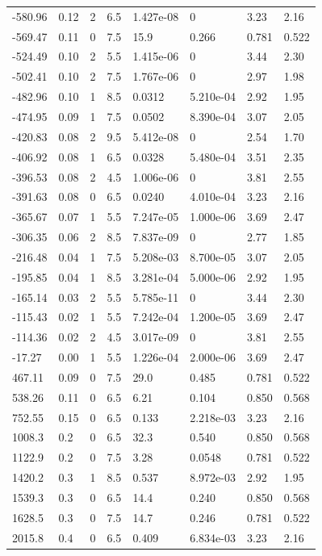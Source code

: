 \documentclass[preview]{standalone}
\begin{document}
{{\begin{tabular}{L{1.2cm}C{1.2cm} C{0.3cm}C{0.5cm} C{1.4cm}C{1.4cm} C{1.4cm}C{1.4cm}}
  -580.96  &  0.12  & 2     & 6.5 &  1.427e-08  & 0  & 3.23 &  2.16   \\ 
  -569.47  &  0.11  & 0     & 7.5 &  15.9  & 0.266  & 0.781 &  0.522   \\ 
  -524.49  &  0.10  & 2     & 5.5 &  1.415e-06  & 0  & 3.44 &  2.30   \\ 
  -502.41  &  0.10  & 2     & 7.5 &  1.767e-06  & 0  & 2.97 &  1.98   \\ 
  -482.96  &  0.10  & 1     & 8.5 &  0.0312  & 5.210e-04  & 2.92 &  1.95   \\ 
  -474.95  &  0.09  & 1     & 7.5 &  0.0502  & 8.390e-04  & 3.07 &  2.05   \\ 
  -420.83  &  0.08  & 2     & 9.5 &  5.412e-08  & 0  & 2.54 &  1.70   \\ 
  -406.92  &  0.08  & 1     & 6.5 &  0.0328  & 5.480e-04  & 3.51 &  2.35   \\ 
  -396.53  &  0.08  & 2     & 4.5 &  1.006e-06  & 0  & 3.81 &  2.55   \\ 
  -391.63  &  0.08  & 0     & 6.5 &  0.0240  & 4.010e-04  & 3.23 &  2.16   \\ 
  -365.67  &  0.07  & 1     & 5.5 &  7.247e-05  & 1.000e-06  & 3.69 &  2.47   \\ 
  -306.35  &  0.06  & 2     & 8.5 &  7.837e-09  & 0  & 2.77 &  1.85   \\ 
  -216.48  &  0.04  & 1     & 7.5 &  5.208e-03  & 8.700e-05  & 3.07 &  2.05   \\ 
  -195.85  &  0.04  & 1     & 8.5 &  3.281e-04  & 5.000e-06  & 2.92 &  1.95   \\ 
  -165.14  &  0.03  & 2     & 5.5 &  5.785e-11  & 0  & 3.44 &  2.30   \\ 
  -115.43  &  0.02  & 1     & 5.5 &  7.242e-04  & 1.200e-05  & 3.69 &  2.47   \\ 
  -114.36  &  0.02  & 2     & 4.5 &  3.017e-09  & 0  & 3.81 &  2.55   \\ 
  -17.27  &  0.00  & 1     & 5.5 &  1.226e-04  & 2.000e-06  & 3.69 &  2.47   \\ 
  467.11  &  0.09  & 0     & 7.5 &  29.0  & 0.485  & 0.781 &  0.522   \\ 
  538.26  &  0.11  & 0     & 6.5 &  6.21  & 0.104  & 0.850 &  0.568   \\ 
  752.55  &  0.15  & 0     & 6.5 &  0.133  & 2.218e-03  & 3.23 &  2.16   \\ 
  1008.3  &   0.2  & 0     & 6.5 &  32.3  & 0.540  & 0.850 &  0.568   \\ 
  1122.9  &   0.2  & 0     & 7.5 &  3.28  & 0.0548  & 0.781 &  0.522   \\ 
  1420.2  &   0.3  & 1     & 8.5 &  0.537  & 8.972e-03  & 2.92 &  1.95   \\ 
  1539.3  &   0.3  & 0     & 6.5 &  14.4  & 0.240  & 0.850 &  0.568   \\ 
  1628.5  &   0.3  & 0     & 7.5 &  14.7  & 0.246  & 0.781 &  0.522   \\ 
  2015.8  &   0.4  & 0     & 6.5 &  0.409  & 6.834e-03  & 3.23 &  2.16   \\ 
\hline 
\end{tabular} 

}}
\end{document}
